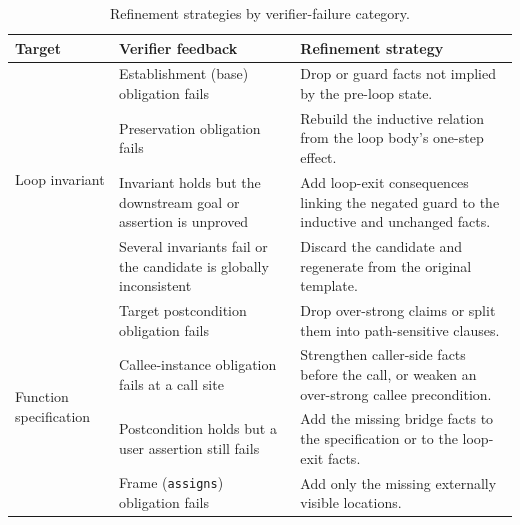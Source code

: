 \begin{table}[t]
\centering
\setlength{\tabcolsep}{5pt}
\caption{Refinement strategies by verifier-failure category.}
\label{tab:refine-strategy}
\begin{tabular}{@{}p{}p{}p{}@{}}
\toprule
\textbf{Target} & \textbf{Verifier feedback} & \textbf{Refinement strategy} \\
\midrule
\multirow{4}{*}{Loop invariant}
 & Establishment (base) obligation fails & Drop or guard facts not implied by the pre-loop state. \\
 & Preservation obligation fails & Rebuild the inductive relation from the loop body's one-step effect. \\
 & Invariant holds but the downstream goal or assertion is unproved & Add loop-exit consequences linking the negated guard to the inductive and unchanged facts. \\
 & Several invariants fail or the candidate is globally inconsistent & Discard the candidate and regenerate from the original template. \\
\midrule
\multirow{4}{*}{Function specification}
 & Target postcondition obligation fails & Drop over-strong claims or split them into path-sensitive clauses. \\
 & Callee-instance obligation fails at a call site & Strengthen caller-side facts before the call, or weaken an over-strong callee precondition. \\
 & Postcondition holds but a user assertion still fails & Add the missing bridge facts to the specification or to the loop-exit facts. \\
 & Frame (\texttt{assigns}) obligation fails & Add only the missing externally visible locations. \\
\bottomrule
\end{tabular}
\end{table}

